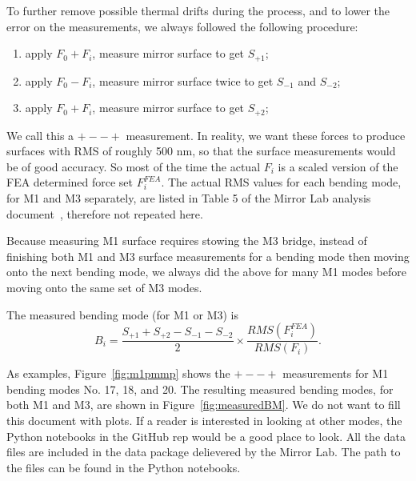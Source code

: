 \documentclass [twoside,openbib,12pt]{article}
\newcommand{\beq}{\begin{equation}}
\newcommand{\eeq}{\end{equation}}
\newcommand{\bnum}{\begin{enumerate}}
\newcommand{\enum}{\end{enumerate}}
\begin{document}
To further remove possible thermal drifts during the process, and to
lower the error on the measurements, we always followed the following
procedure:
\bnum
\item apply $F_0+F_i$, measure mirror surface to get $S_{+1}$;
  \item apply $F_0-F_i$, measure mirror surface twice to get $S_{-1}$ and
    $S_{-2}$;
    \item apply $F_0+F_i$, measure mirror surface to get $S_{+2}$;
      \enum
      We call this a $+--+$ measurement.
      In reality, we want these forces to produce surfaces with RMS of
      roughly 500 nm, so that the surface measurements would be of
      good accuracy. So most of the time the actual $F_i$ is a scaled
      version of the FEA determined force set $F_i^{FEA}$. The actual
      RMS values for each bending mode, for M1 and M3 separately, are
      listed in Table 5 of the Mirror Lab analysis document~\cite{m1m3UAreport},
      therefore not repeated here.

Because measuring M1 surface requires stowing the M3 bridge, instead
of finishing both M1 and M3 surface measurements for a bending mode
then moving onto the next bending mode, we always did the above for many
M1 modes before moving onto the same set of M3 modes.

      The measured bending mode (for M1 or M3) is
      \beq
      B_i = \frac{S_{+1} + S_{+2} - S_{-1} - S_{-2}}{2} \times
      \frac{RMS(F_i^{FEA})}{RMS(F_i)}.
      \eeq

 As examples, Figure~\ref{fig:m1pmmp} shows the $+--+$ measurements
 for M1 bending modes No. 17, 18, and 20.
 The resulting measured bending modes, for both M1 and M3, are shown
 in Figure~\ref{fig:measuredBM}.
 We do not want to fill this document with plots. If a reader is
 interested in looking at other modes, the Python notebooks in the
 GitHub rep would be a good place to look. All the data files are
 included in the data package delievered by the Mirror Lab. The path
 to the files can be found in the Python notebooks.
\end{document}
